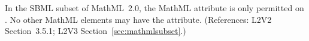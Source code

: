 In the SBML subset of MathML~2.0, the MathML attribute
 is only permitted on \changed{,} 
.  No other
MathML elements may have the  attribute.
(References: L2V2 Section~3.5.1; L2V3 Section~\ref{sec:mathmlsubset}.)
